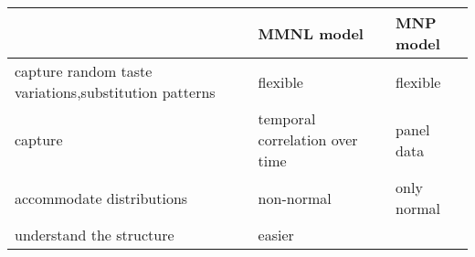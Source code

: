 \documentclass[
]{article}
\begin{document}
\begin{longtable}[]{@{}lll@{}}
\toprule
\begin{minipage}[b]{0.13\columnwidth}\raggedright
\strut
\end{minipage} & \begin{minipage}[b]{0.39\columnwidth}\raggedright
MMNL model\strut
\end{minipage} & \begin{minipage}[b]{0.39\columnwidth}\raggedright
MNP model\strut
\end{minipage}\tabularnewline
\midrule
\endhead
\begin{minipage}[t]{0.13\columnwidth}\raggedright
capture random taste variations,substitution patterns\strut
\end{minipage} & \begin{minipage}[t]{0.39\columnwidth}\raggedright
flexible\strut
\end{minipage} & \begin{minipage}[t]{0.39\columnwidth}\raggedright
flexible\strut
\end{minipage}\tabularnewline
\begin{minipage}[t]{0.13\columnwidth}\raggedright
capture\strut
\end{minipage} & \begin{minipage}[t]{0.39\columnwidth}\raggedright
temporal correlation over time\strut
\end{minipage} & \begin{minipage}[t]{0.39\columnwidth}\raggedright
panel data\strut
\end{minipage}\tabularnewline
\begin{minipage}[t]{0.13\columnwidth}\raggedright
accommodate distributions\strut
\end{minipage} & \begin{minipage}[t]{0.39\columnwidth}\raggedright
non-normal\strut
\end{minipage} & \begin{minipage}[t]{0.39\columnwidth}\raggedright
only normal\strut
\end{minipage}\tabularnewline
\begin{minipage}[t]{0.13\columnwidth}\raggedright
understand the structure\strut
\end{minipage} & \begin{minipage}[t]{0.39\columnwidth}\raggedright
easier\strut
\end{minipage} & \begin{minipage}[t]{0.39\columnwidth}\raggedright

\end{minipage}
\end{longtable}
\end{document}
